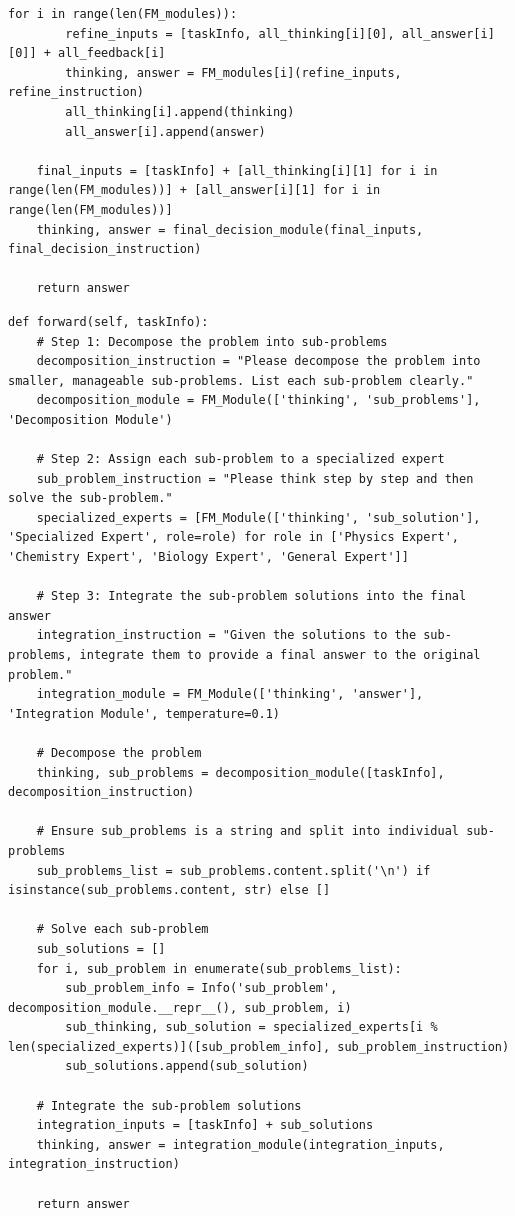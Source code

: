 \begin{lstlisting}[style=pythonstyle, caption={Example discovered agent: Multi-Step Peer Review Agent}]
    for i in range(len(FM_modules)):
        refine_inputs = [taskInfo, all_thinking[i][0], all_answer[i][0]] + all_feedback[i]
        thinking, answer = FM_modules[i](refine_inputs, refine_instruction)
        all_thinking[i].append(thinking)
        all_answer[i].append(answer)

    final_inputs = [taskInfo] + [all_thinking[i][1] for i in range(len(FM_modules))] + [all_answer[i][1] for i in range(len(FM_modules))]
    thinking, answer = final_decision_module(final_inputs, final_decision_instruction)

    return answer
\end{lstlisting}


\begin{lstlisting}[style=pythonstyle, caption={Example discovered agent: Divide and Conquer Agent}]
def forward(self, taskInfo):
    # Step 1: Decompose the problem into sub-problems
    decomposition_instruction = "Please decompose the problem into smaller, manageable sub-problems. List each sub-problem clearly."
    decomposition_module = FM_Module(['thinking', 'sub_problems'], 'Decomposition Module')

    # Step 2: Assign each sub-problem to a specialized expert
    sub_problem_instruction = "Please think step by step and then solve the sub-problem."
    specialized_experts = [FM_Module(['thinking', 'sub_solution'], 'Specialized Expert', role=role) for role in ['Physics Expert', 'Chemistry Expert', 'Biology Expert', 'General Expert']]

    # Step 3: Integrate the sub-problem solutions into the final answer
    integration_instruction = "Given the solutions to the sub-problems, integrate them to provide a final answer to the original problem."
    integration_module = FM_Module(['thinking', 'answer'], 'Integration Module', temperature=0.1)

    # Decompose the problem
    thinking, sub_problems = decomposition_module([taskInfo], decomposition_instruction)

    # Ensure sub_problems is a string and split into individual sub-problems
    sub_problems_list = sub_problems.content.split('\n') if isinstance(sub_problems.content, str) else []

    # Solve each sub-problem
    sub_solutions = []
    for i, sub_problem in enumerate(sub_problems_list):
        sub_problem_info = Info('sub_problem', decomposition_module.__repr__(), sub_problem, i)
        sub_thinking, sub_solution = specialized_experts[i % len(specialized_experts)]([sub_problem_info], sub_problem_instruction)
        sub_solutions.append(sub_solution)

    # Integrate the sub-problem solutions
    integration_inputs = [taskInfo] + sub_solutions
    thinking, answer = integration_module(integration_inputs, integration_instruction)

    return answer
\end{lstlisting}

